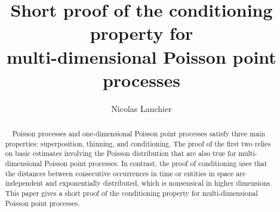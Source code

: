\documentclass[letterpaper,11pt,twoside,keywordsasfootnote,addressatend,noinfoline]{article}
\begin{document}
\begin{frontmatter}
\title{Short proof of the conditioning property for \\ multi-dimensional Poisson point processes}
\author{Nicolas Lanchier}
\address{School of Mathematical and Statistical Sciences \\ Arizona State University \\ Tempe, AZ 85287, USA. \\ nicolas.lanchier@asu.edu}
\maketitle

\begin{abstract} \ \
 Poisson processes and one-dimensional Poisson point processes satisfy three main properties: superposition, thinning, and conditioning.
 The proof of the first two relies on basic estimates involving the Poisson distribution that are also true for multi-dimensional Poisson point processes.
 In contrast, the proof of conditioning uses that the distances between consecutive occurrences in time or entities in space are independent and exponentially distributed, which is nonsensical in higher dimensions.
 This paper gives a short proof of the conditioning property for multi-dimensional Poisson point processes.
\end{abstract}

\begin{keyword}[class=AMS]
\end{keyword}

\begin{keyword}
\end{keyword}

\end{frontmatter}

\end{document}
